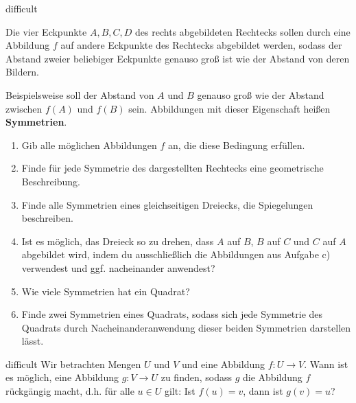 \documentclass[../abbildungen.tex]{subfiles}
\begin{document}
\begin{exercise}{difficult}
    
    Die vier Eckpunkte $A,B,C,D$ des rechts abgebildeten Rechtecks sollen durch eine Abbildung $f$ auf andere Eckpunkte des Rechtecks abgebildet werden, sodass der Abstand zweier beliebiger Eckpunkte genauso groß ist wie der Abstand von deren Bildern. 
    
    Beispielsweise soll der Abstand von $A$ und $B$ genauso groß wie der Abstand zwischen $f(A)$ und $f(B)$ sein. Abbildungen mit dieser Eigenschaft heißen \textbf{Symmetrien}.
    \begin{enumerate}
        \item Gib alle möglichen Abbildungen $f$ an, die diese Bedingung erfüllen.
        \item Finde für jede Symmetrie des dargestellten Rechtecks eine geometrische Beschreibung.
        \item Finde alle Symmetrien eines gleichseitigen Dreiecks, die Spiegelungen beschreiben.
        \item Ist es möglich, das Dreieck so zu drehen, dass $A$ auf $B$, $B$ auf $C$ und $C$ auf $A$ abgebildet wird, indem du ausschließlich die Abbildungen aus Aufgabe c) verwendest und ggf. nacheinander anwendest?
        \item Wie viele Symmetrien hat ein Quadrat?
        \item Finde zwei Symmetrien eines Quadrats, sodass sich jede Symmetrie des Quadrats durch Nacheinanderanwendung dieser beiden Symmetrien darstellen lässt.
    \end{enumerate}
\end{exercise}

\begin{exercise}{difficult}
    Wir betrachten Mengen $U$ und $V$ und eine Abbildung $f\colon U\rightarrow V$. Wann ist es möglich, eine Abbildung $g\colon V\rightarrow U$ zu finden, sodass $g$ die Abbildung $f$ rückgängig macht, d.h. für alle $u\in U$ gilt: Ist $f(u)=v$, dann ist $g(v)=u$?
\end{exercise}
\end{document}
